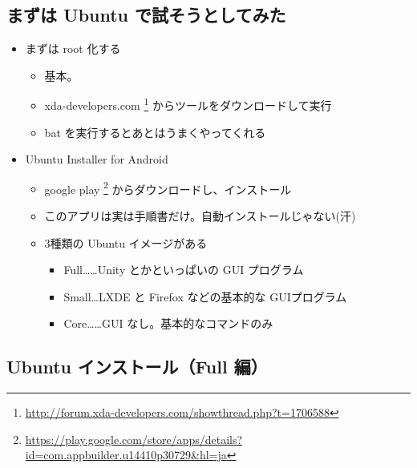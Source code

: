 \documentclass[mingoth,a4paper]{jsarticle}
\begin{document}
\subsection{まずは Ubuntu で試そうとしてみた}
\begin{itemize}
 \item まずは root 化する
       \begin{itemize}
        \item 基本。
        \item xda-developers.com \footnote{\url{http://forum.xda-developers.com/showthread.php?t=1706588}} からツールをダウンロードして実行
        \item bat を実行するとあとはうまくやってくれる
       \end{itemize}
\item Ubuntu Installer for Android
      \begin{itemize}
       \item google play \footnote{\url{https://play.google.com/store/apps/details?id=com.appbuilder.u14410p30729&hl=ja}} からダウンロードし、インストール
       \item このアプリは実は手順書だけ。自動インストールじゃない(汗)
       \item 3種類の Ubuntu イメージがある
             \begin{itemize}
              \item Full……Unity とかといっぱいの GUI プログラム
              \item Small…LXDE と Firefox などの基本的な GUIプログラム
              \item Core……GUI なし。基本的なコマンドのみ
             \end{itemize}
      \end{itemize}
\end{itemize}

\subsection{Ubuntu インストール（Full 編）}
\end{document}
